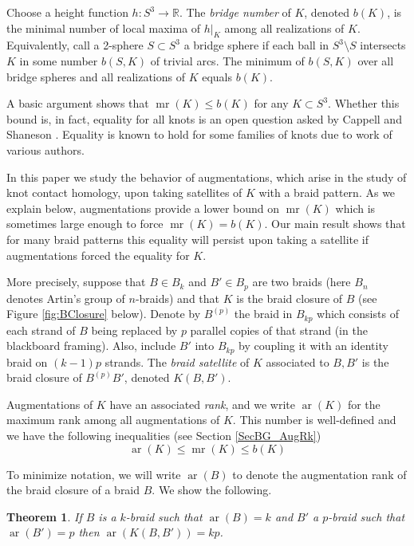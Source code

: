 \documentclass{amsart}[11pt,fullpage]
\def\R{{\mathbb R}}
\def\ar{\operatorname{ar}}
\def\mr{\operatorname{mr}}
\newtheorem{thm}{Theorem}[section]
\theoremstyle{definition}
\begin{document}
Choose a height function $h:S^3\to\R$. The \emph{bridge number} of $K$, denoted $b(K)$, is the minimal number of local maxima of $h|_{K}$ among all realizations of $K$. Equivalently, call a 2-sphere $S\subset S^3$ a bridge sphere if each ball in $S^3\setminus S$ intersects $K$ in some number $b(S,K)$ of trivial arcs. The minimum of $b(S,K)$ over all bridge spheres and all realizations of $K$ equals $b(K)$.

A basic argument shows that $\mr(K)\le b(K)$ for any $K\subset S^3$. Whether this bound is, in fact, equality for all knots is an open question asked by Cappell and Shaneson \cite[Prob. 1.11]{Kir95}. Equality is known to hold for some families of knots due to work of various authors. 

In this paper we study the behavior of augmentations, which arise in the study of knot contact homology, upon taking satellites of $K$ with a braid pattern. As we explain below, augmentations provide a lower bound on $\mr(K)$ which is sometimes large enough to force $\mr(K)=b(K)$. Our main result shows that for many braid patterns this equality will persist upon taking a satellite if augmentations forced the equality for $K$.

More precisely, suppose that $B\in B_k$ and $B'\in B_p$ are two braids (here $B_n$ denotes Artin's group of $n$-braids) and that $K$ is the braid closure of $B$ (see Figure \ref{fig:BClosure} below). Denote by $B^{(p)}$ the braid in $B_{kp}$ which consists of each strand of $B$ being replaced by $p$ parallel copies of that strand (in the blackboard framing). Also, include $B'$ into $B_{kp}$ by coupling it with an identity braid on $(k-1)p$ strands. The \emph{braid satellite} of $K$ associated to $B, B'$ is the braid closure of $B^{(p)}B'$, denoted $K(B,B')$.

Augmentations of $K$ have an associated \emph{rank}, and we write $\ar(K)$ for the maximum rank among all augmentations of $K$. This number is well-defined and we have the following inequalities (see Section \ref{SecBG_AugRk})
      \begin{equation}
      \ar(K)\le\mr(K)\le b(K)
      \label{Eqn:ARvMRvb}
      \end{equation}

To minimize notation, we will write $\ar(B)$ to denote the augmentation rank of the braid closure of a braid $B$. We show the following. 

\begin{thm}\label{main}
If $B$ is a $k$-braid such that $\ar(B)=k$ and $B'$ a $p$-braid such that $\ar(B')=p$ then $\ar(K(B,B'))=kp$.
\end{thm}
\end{document}
